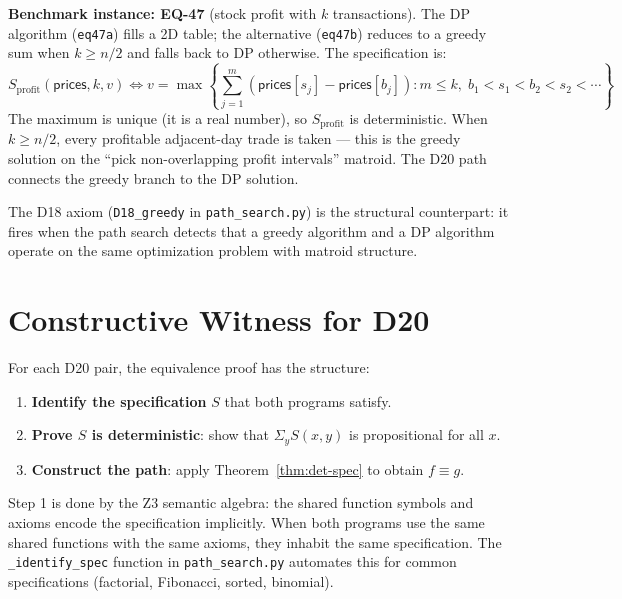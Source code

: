 \documentclass[11pt,a4paper]{report}
\theoremstyle{definition}
\theoremstyle{plain}
\begin{document}
\noindent\textbf{Benchmark instance: EQ-47} (stock profit with $k$
transactions).  The DP algorithm (\texttt{eq47a}) fills a 2D table;
the alternative (\texttt{eq47b}) reduces to a greedy sum when
$k \ge n/2$ and falls back to DP otherwise.  The specification is:
\[
  S_{\mathrm{profit}}(\mathsf{prices}, k, v) \iff
  v = \max\left\{\sum_{j=1}^{m}
    (\mathsf{prices}[s_j] - \mathsf{prices}[b_j])
    : m \le k,\; b_1 < s_1 < b_2 < s_2 < \cdots\right\}
\]
The maximum is unique (it is a real number), so $S_{\mathrm{profit}}$
is deterministic.  When $k \ge n/2$, every profitable adjacent-day
trade is taken --- this is the greedy solution on the ``pick
non-overlapping profit intervals'' matroid.  The D20 path connects
the greedy branch to the DP solution.

The D18 axiom (\texttt{D18\_greedy} in \texttt{path\_search.py}) is
the structural counterpart: it fires when the path search detects
that a greedy algorithm and a DP algorithm operate on the same
optimization problem with matroid structure.


\section{Constructive Witness for D20}

For each D20 pair, the equivalence proof has the structure:

\begin{enumerate}
  \item \textbf{Identify the specification} $S$ that both programs
    satisfy.
  \item \textbf{Prove $S$ is deterministic}: show that
    $\Sigma_y S(x, y)$ is propositional for all $x$.
  \item \textbf{Construct the path}: apply Theorem~\ref{thm:det-spec}
    to obtain $f \equiv g$.
\end{enumerate}

Step 1 is done by the Z3 semantic algebra: the shared function
symbols and axioms encode the specification implicitly.  When both
programs use the same shared functions with the same axioms, they
inhabit the same specification.  The \texttt{\_identify\_spec}
function in \texttt{path\_search.py} automates this for common
specifications (factorial, Fibonacci, sorted, binomial).
\end{document}
